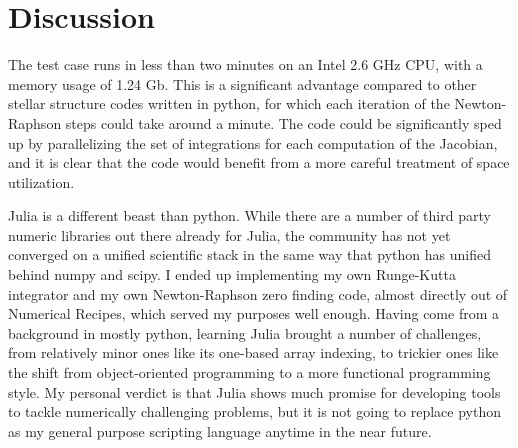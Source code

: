\documentclass[onecolumn]{article}
\begin{document}
\section{Discussion}

The test case runs in less than two minutes on an Intel 2.6 GHz CPU, with a memory usage of 1.24 Gb.  This is a significant advantage compared to other stellar structure codes written in python, for which each iteration of the Newton-Raphson steps could take around a minute.  The code could be significantly sped up by parallelizing the set of integrations for each computation of the Jacobian, and it is clear that the code would benefit from a more careful treatment of space utilization.

Julia is a different beast than python.  While there are a number of third party numeric libraries out there already for Julia, the community has not yet converged on a unified scientific stack in the same way that python has unified behind numpy and scipy.  I ended up implementing my own Runge-Kutta integrator and my own Newton-Raphson zero finding code, almost directly out of Numerical Recipes, which served my purposes well enough.  Having come from a background in mostly python, learning Julia brought a number of challenges, from relatively minor ones like its one-based array indexing, to trickier ones like the shift from object-oriented programming to a more functional programming style.  My personal verdict is that Julia shows much promise for developing tools to tackle numerically challenging problems, but it is not going to replace python as my general purpose scripting language anytime in the near future.
\end{document}
